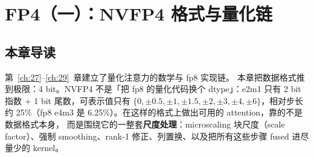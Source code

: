\chapter{FP4（一）：NVFP4 格式与量化链}\label{ch:31}

\section{本章导读}

第~\ref{ch:27}--\ref{ch:29}~章建立了量化注意力的数学与 fp8 实现链。
本章把数据格式推到极限：4 bit。NVFP4 不是「把 fp8 的量化代码换个
dtype」：e2m1 只有 2 bit 指数 + 1 bit 尾数，可表示值只有
$\{0,\pm0.5,\pm1,\pm1.5,\pm2,\pm3,\pm4,\pm6\}$，相对步长约 25\%（fp8 e4m3
是 6.25\%）。在这样的格式上做出可用的 attention，靠的不是数据格式本身，
而是围绕它的一整套\textbf{尺度处理}：microscaling 块尺度（scale
factor）、强制 smoothing、rank-1 修正、列置换、以及把所有这些步骤
fused 进尽量少的 kernel。
